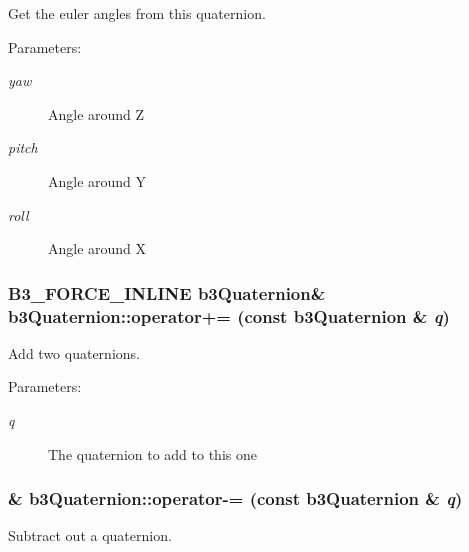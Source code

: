 Get the euler angles from this quaternion. 

\begin{Desc}
\item[Parameters:]
\begin{description}
\item[{\em yaw}]Angle around Z \item[{\em pitch}]Angle around Y \item[{\em roll}]Angle around X \end{description}
\end{Desc}
\hypertarget{classb3_quaternion_558450afdbe170892934fa936d085b1b}{
\subsubsection[operator+=]{\setlength{\rightskip}{0pt plus 5cm}B3\_\-FORCE\_\-INLINE {\bf b3Quaternion}\& b3Quaternion::operator+= (const {\bf b3Quaternion} \& {\em q})}}
\label{classb3_quaternion_558450afdbe170892934fa936d085b1b}


Add two quaternions. 

\begin{Desc}
\item[Parameters:]
\begin{description}
\item[{\em q}]The quaternion to add to this one \end{description}
\end{Desc}
\hypertarget{classb3_quaternion_76087565cf44b29f38d8d2b5ac3cc268}{
\subsubsection[operator-=]{\& b3Quaternion::operator-= (const {\bf b3Quaternion} \& {\em q})}}
\label{classb3_quaternion_76087565cf44b29f38d8d2b5ac3cc268}


Subtract out a quaternion. 

